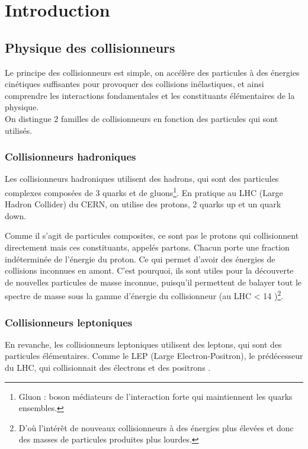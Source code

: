 
\chapter{Introduction}

\section{Physique des collisionneurs}

Le principe des collisionneurs est simple, on accélère des particules à des 
énergies cinétiques suffisantes pour provoquer des collisions inélastiques, et ainsi comprendre les interactions fondamentales et les constituants élémentaires de la physique.\\

On distingue 2 familles de collisionneurs en fonction des particules qui sont utilisés.

\subsection{Collisionneurs hadroniques}

Les collisionneurs hadroniques utilisent des hadrons, qui sont des 
particules complexes composées de 3 quarks et de gluons\footnote{Gluon : boson médiateurs de l'interaction forte qui maintiennent les quarks ensembles.}. 
En pratique au LHC (Large Hadron Collider) du CERN, on utilise des protons, 2 quarks up et un quark down. 

Comme il s'agit de particules composites, ce sont pas le protons qui collisionnent directement mais ces constituants, appelés partons. Chacun porte une fraction indéterminée de l'énergie du proton. 
Ce qui permet d'avoir des énergies de collisions inconnues en amont.
C'est pourquoi, ils sont utiles pour la découverte de nouvelles particules de masse inconnue, puisqu'il permettent de balayer tout le spectre de masse sous la gamme d'énergie du collisionneur (au LHC < 14 \TeV)\footnote{D'où l'intérêt de nouveaux collisionneurs à des énergies plus élevées et donc des masses de particules produites plus lourdes.}.

\subsection{Collisionneurs leptoniques}

En revanche, les collisionneurs leptoniques utilisent des leptons, qui sont des particules élémentaires. Comme le LEP (Large Electron-Positron), le prédécesseur du LHC, qui collisionnait des électrons et des positrons \cite{cern:lep}.

